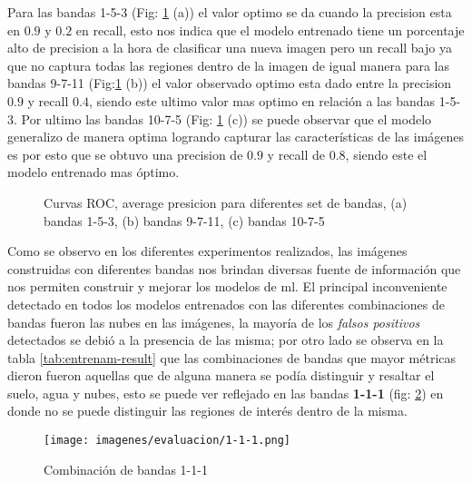 Para las bandas 1-5-3 (Fig: \ref{fig:Average_precision} (a)) el valor optimo se da cuando la precision esta en $0.9$ y $0.2$ en recall, esto nos indica que el modelo entrenado tiene un porcentaje alto de precision a la hora de clasificar una nueva imagen pero un recall bajo ya que no captura todas las regiones dentro de la imagen de igual manera para las bandas 9-7-11 (Fig:\ref{fig:Average_precision} (b)) el valor observado optimo esta dado entre la precision $0.9$ y recall $0.4$, siendo este ultimo valor mas optimo en relación a las bandas 1-5-3. Por ultimo las bandas 10-7-5 (Fig: \ref{fig:Average_precision} (c)) se puede observar que el modelo generalizo de manera optima logrando capturar las características de las imágenes es por esto que se obtuvo una precision de $0.9$ y recall  de $0.8$, siendo este el modelo entrenado mas óptimo. 

\begin{figure}[htbp]
\centering
{}
\caption{Curvas ROC, average presicion para diferentes set de bandas, (a) bandas 1-5-3, (b) bandas 9-7-11, (c) bandas 10-7-5} \label{fig:Average_precision}
\end{figure}
 
Como se observo en los diferentes experimentos realizados, las imágenes construidas con diferentes bandas nos brindan diversas fuente de información que nos permiten construir y mejorar los modelos de \ac{ml}. El principal inconveniente detectado en todos los modelos entrenados con las diferentes combinaciones de bandas fueron las nubes en las imágenes, la mayoría de los \textit{falsos positivos} detectados se debió a la presencia de las misma; por otro lado se observa en la tabla \ref{tab:entrenam-result} que las combinaciones de bandas que mayor métricas dieron fueron aquellas que de alguna manera se podía distinguir y resaltar el suelo, agua y nubes, esto se puede ver reflejado en las bandas  \textbf{1-1-1} (fig: \ref{Fig:imagen_banda_111}) en donde no se puede distinguir las regiones de interés dentro de la misma. 
 
 \begin{figure}[H]\centering
  \texttt{[image: imagenes/evaluacion/1-1-1.png]}
  \caption{Combinación de bandas 1-1-1} \label{Fig:imagen_banda_111}
\end{figure}
 
